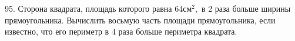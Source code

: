 95. Сторона квадрата, площадь которого равна $64\text{см}^2,$ в 2 раза больше ширины прямоугольника. Вычислить восьмую часть площади прямоугольника, если известно, что его периметр в 4 раза больше периметра квадрата.\\
